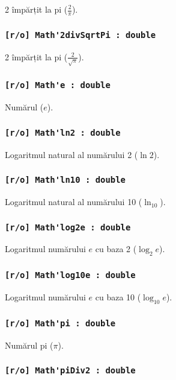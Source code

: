 2 împărțit la pi ($\frac{2}{\pi}$).

\subsubsection{\lstinline|[r/o] Math'2divSqrtPi : double|}

2 împărțit la pi ($\frac{2}{\sqrt{\pi}}$).

\subsubsection{\lstinline|[r/o] Math'e : double|}

Numărul ($e$).

\subsubsection{\lstinline|[r/o] Math'ln2 : double|}

Logaritmul natural al numărului 2 ($\ln{2}$).

\subsubsection{\lstinline|[r/o] Math'ln10 : double|}

Logaritmul natural al numărului 10 ($\ln_{10}$).

\subsubsection{\lstinline|[r/o] Math'log2e : double|}

Logaritmul numărului $e$ cu baza 2 ($\log_{2}{e}$).

\subsubsection{\lstinline|[r/o] Math'log10e : double|}

Logaritmul numărului $e$ cu baza 10 ($\log_{10}{e}$).

\subsubsection{\lstinline|[r/o] Math'pi : double|}

Numărul pi ($\pi$).

\subsubsection{\lstinline|[r/o] Math'piDiv2 : double|}

